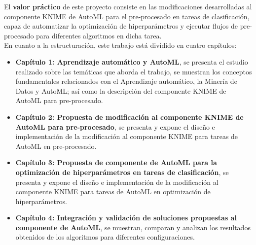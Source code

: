 El \textbf{valor práctico} de este proyecto consiste en las modificaciones desarrolladas al componente KNIME de AutoML para el pre-procesado en tareas de clasificación, capaz de automatizar la optimización de hiperparámetros y ejecutar flujos de pre-procesado para diferentes algoritmos en dicha tarea. \\
En cuanto a la estructuración, este trabajo está dividido en cuatro capítulos:
\begin{itemize}
	\item \textbf{Capítulo 1: Aprendizaje automático y AutoML}, se presenta el estudio realizado sobre las temáticas que aborda el trabajo, se muestran los conceptos fundamentales relacionados con el Aprendizaje automático, la Minería de Datos y AutoML; así como la descripción del componente KNIME de AutoML para pre-procesado.
	\item \textbf{Capítulo 2: Propuesta de modificación al componente KNIME de AutoML para pre-procesado}, se presenta y expone el diseño e implementación de la modificación al componente KNIME para tareas de AutoML en pre-procesado.
	\item \textbf{Capítulo 3: Propuesta de componente de AutoML para la optimización de hiperparámetros en tareas de clasificación}, se presenta y expone el diseño e implementación de la modificación al componente KNIME para tareas de AutoML en optimización de hiperparámetros.
	\item \textbf{Capítulo 4: Integración y validación de soluciones propuestas al componente de AutoML}, se muestran, comparan y analizan los resultados obtenidos de los algoritmos para diferentes configuraciones.
\end{itemize}







